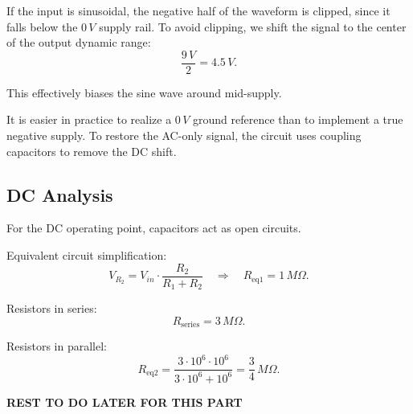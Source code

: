 If the input is sinusoidal, the negative half of the waveform is clipped, since it falls below the $0 \, V$ supply rail.  
To avoid clipping, we shift the signal to the center of the output dynamic range:
\[
    \frac{9 \, V}{2} = 4.5 \, V.
\]

This effectively biases the sine wave around mid-supply.  

\begin{tcolorbox}[colback=gray!10,colframe=black,title=Important Note]
It is easier in practice to realize a $0 \, V$ ground reference than to implement a true negative supply.  
To restore the AC-only signal, the circuit uses coupling capacitors to remove the DC shift.
\end{tcolorbox}

\subsection{DC Analysis}

For the DC operating point, capacitors act as open circuits.  

Equivalent circuit simplification:  
\[
    V_{R_2} = V_{in} \cdot \frac{R_2}{R_1 + R_2} 
    \quad \Rightarrow \quad 
    R_{\text{eq1}} = 1 \, M\Omega.
\]

Resistors in series:
\[
    R_{\text{series}} = 3 \, M\Omega.
\]

Resistors in parallel:
\[
    R_{\text{eq2}} = \frac{3 \cdot 10^6 \cdot 10^6}{3 \cdot 10^6 + 10^6} 
    = \frac{3}{4} \, M\Omega.
\]

\textbf{REST TO DO LATER FOR THIS PART }
